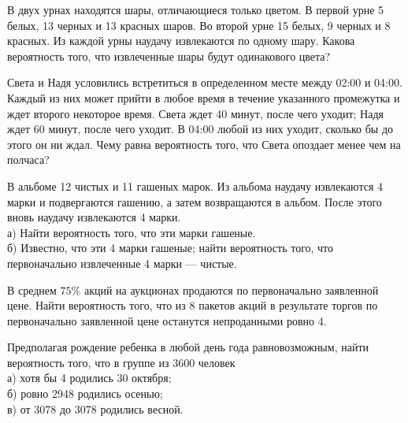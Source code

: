 \newpage\setcounter{zad}{0}



\begin{zkrW}{20}\noindent 
	В двух урнах находятся шары, отличающиеся только цветом. В первой урне 5 белых, 13 черных и 13 красных шаров. Во второй урне 15 белых, 9 черных и 8 красных. Из каждой урны наудачу извлекаются по одному шару. Какова вероятность того, что извлеченные шары будут одинакового цвета?
 
\end{zkrW}

\begin{zkrW}{20}\noindent 
	Света и Надя условились встретиться в определенном месте между 02:00 и 04:00. Каждый из них может прийти в любое время в течение указанного промежутка и ждет второго некоторое время. Света ждет 40 минут, после чего уходит; Надя ждет 60 минут, после чего уходит. В 04:00 любой из них уходит, сколько бы до этого он ни ждал. Чему равна вероятность того, что Света опоздает менее чем на полчаса?
 
\end{zkrW}

\begin{zkrW}{20}\noindent 
	В альбоме 12 чистых и 11 гашеных марок. Из альбома наудачу извлекаются 4 марки и подвергаются гашению, а затем возвращаются в альбом. После этого вновь наудачу извлекаются 4 марки. \\ \indent а) Найти вероятность того, что эти марки гашеные. \\ \indent б) Известно, что эти 4 марки гашеные; найти вероятность того, что первоначально извлеченные 4 марки --- чистые.
 
\end{zkrW}

\begin{zkrW}{20}\noindent 
	В среднем $75\%$ акций на аукционах продаются по первоначально заявленной цене. Найти вероятность того, что из 8 пакетов акций в результате торгов по первоначально заявленной цене останутся непроданными ровно 4.
 
\end{zkrW}

\begin{zkrW}{20}\noindent 
	Предполагая рождение ребенка в любой день года равновозможным, найти вероятность того, что в группе из 3600 человек \\ \indent а) хотя бы 4 родились 30 октября; \\ \indent б) ровно 2948 родились осенью; \\ \indent в) от 3078 до 3078 родились весной.
 
\end{zkrW}

